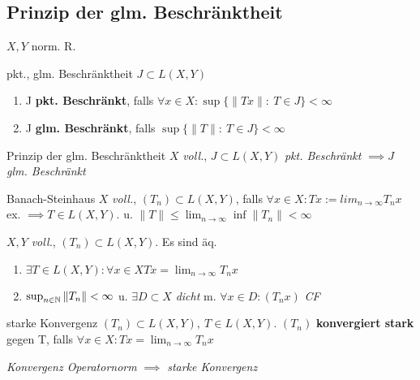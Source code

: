 \subsection{Prinzip der glm. Beschränktheit}
$X,Y$ norm. R.

\begin{definition}{pkt., glm. Beschränktheit}
  $J \subset L(X,Y)$
  \begin{enumerate}[label = (\roman*)]
    \item J \textbf{pkt. Beschränkt},
      falls $\forall x\in X:\sup \{\|Tx\|:\ T \in J\} < \infty$
    \item J \textbf{glm. Beschränkt},
      falls $\sup \{\|T\|:\ T \in J\} < \infty$
  \end{enumerate}
\end{definition}

\begin{satz}{Prinzip der glm. Beschränktheit}
  $X$ \textit{voll.}, $J \subset L(X,Y)$ \textit{pkt. Beschränkt} $\implies J$
  \textit{glm. Beschränkt}
\end{satz}

\begin{satz}{Banach-Steinhaus}
  $X$ \textit{voll.}, $(T_n) \subset L(X,Y)$,
  falls $\forall x\in X: Tx:= lim_{n\to \infty} T_nx$ ex.
  $\implies T \in L(X,Y)$. u.
  $\|T\| \leq \lim_{n\to \infty} \inf \|T_n\| < \infty$
\end{satz}

\begin{korrolar}
  $X,Y$ \textit{voll.}, $(T_n) \subset L(X,Y)$. Es sind äq.
  \begin{enumerate}[label = (\roman*)]
    \item $\exists T \in L(X,Y): \forall x\in X Tx = \lim_{n\to\infty}T_nx$
    \item $\sup_{n \in \mathbb{N}} \|T_n\| <\infty $ u. $\exists D\subset X$
      \textit{dicht} m. $\forall x\in D: (T_nx)$ \textit{CF}
  \end{enumerate}
\end{korrolar}

\begin{definition}{starke Konvergenz}
  $(T_n)\subset L(X,Y),\ T\in L(X,Y)$. $(T_n)$ \textbf{konvergiert stark}
  gegen T, falls $\forall x\in X: Tx = \lim_{n\to\infty}T_nx$
\end{definition}

\begin{bemerkung}
  \textit{Konvergenz Operatornorm} $\implies$ \textit{starke Konvergenz}
\end{bemerkung}
